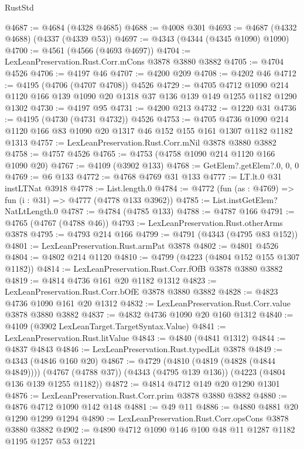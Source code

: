 \begin{lexlean}{RustStd}
\begin{coremodule}
@4687 := @4684 (@4328 @4685)
@4688 := @4008 @301
@4693 := @4687 (@4332 @4688) (@4337 (@4339 @53))
@4697 := @4343 (@4344 (@4345 @1090) @1090)
@4700 := @4561 (@4566 (@4693 @4697))
@4704 := LexLeanPreservation.Rust.Corr.mCons @3878 @3880 @3882
@4705 := @4704 @4526
@4706 := @4197 @46
@4707 := @4200 @209
@4708 := @4202 @46
@4712 := @4195 (@4706 (@4707 @4708)) @4526
@4729 := @4705
    @4712
    @1090
    @214
    @1120
    @166
    @139
    @1090
    @20
    @1318
    @37
    @136
    @139
    @149
    @1255
    @1182
    @1290
    @1302
@4730 := @4197 @95
@4731 := @4200 @213
@4732 := @1220 @31
@4736 := @4195 (@4730 (@4731 @4732)) @4526
@4753 := @4705
    @4736
    @1090
    @214
    @1120
    @166
    @83
    @1090
    @20
    @1317
    @46
    @152
    @155
    @161
    @1307
    @1182
    @1182
    @1313
@4757 := LexLeanPreservation.Rust.Corr.mNil @3878 @3880 @3882
@4758 := @4757 @4526
@4765 := @4753 (@4758 @1090 @214 @1120 @166 @1090 @20)
@4767 := @4109 (@3902 @133)
@4768 := GetElem?.getElem?.{0, 0, 0}
@4769 := @6 @133
@4772 := @4768 @4769 @31 @133
@4777 := LT.lt.{0} @31 instLTNat @3918
@4778 := List.length.{0}
@4784 := @4772 (fun (as : @4769) => fun (i : @31) => @4777 (@4778 @133 @3962))
@4785 := List.instGetElem?NatLtLength.{0}
@4787 := @4784 (@4785 @133)
@4788 := @4787 @166
@4791 := @4765 (@4767 (@4788 @46))
@4793 := LexLeanPreservation.Rust.otherArms @3878
@4795 := @4793 @214 @166
@4799 := @4791 (@4343 (@4795 @83 @152))
@4801 := LexLeanPreservation.Rust.armPat @3878
@4802 := @4801 @4526
@4804 := @4802 @214 @1120
@4810 := @4799 (@4223 (@4804 @152 @155 @1307 @1182))
@4814 := LexLeanPreservation.Rust.Corr.fOfB @3878 @3880 @3882
@4819 := @4814 @4736 @161 @20 @1182 @1312
@4823 := LexLeanPreservation.Rust.Corr.bOfE @3878 @3880 @3882
@4828 := @4823 @4736 @1090 @161 @20 @1312
@4832 := LexLeanPreservation.Rust.Corr.value @3878 @3880 @3882
@4837 := @4832 @4736 @1090 @20 @160 @1312
@4840 := @4109 (@3902 LexLeanTarget.TargetSyntax.Value)
@4841 := LexLeanPreservation.Rust.litValue
@4843 := @4840 (@4841 @1312)
@4844 := @4837 @4843
@4846 := LexLeanPreservation.Rust.typedLit @3878
@4849 := @4343 (@4846 @160 @20)
@4867 := @4729
    (@4810 (@4819 (@4828 (@4844 @4849))))
    (@4767 (@4788 @37))
    (@4343 (@4795 @139 @136))
    (@4223 (@4804 @136 @139 @1255 @1182))
@4872 := @4814 @4712 @149 @20 @1290 @1301
@4876 := LexLeanPreservation.Rust.Corr.prim @3878 @3880 @3882
@4880 := @4876 @4712 @1090 @142 @148
@4881 := @49 @11
@4886 := @4880 @4881 @20 @1290 @1299 @1294
@4890 := LexLeanPreservation.Rust.Corr.opsCons @3878 @3880 @3882
@4902 := @4890 @4712 @1090 @146 @100 @48 @11 @1287 @1182 @1195 @1257 @53 @1221

\end{coremodule}
\end{lexlean}
